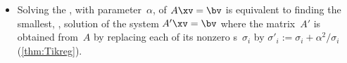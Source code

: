 \begin{itemize}
\item Solving the , with parameter~\(\alpha\), of \(A\xv=\bv\) is equivalent to finding the smallest, , solution of the system \(A'\xv=\bv\) where  
the matrix~\(A'\) is obtained from~\(A\) by replacing each of its nonzero s~\(\sigma_i\) by \(\sigma'_i:=\sigma_i+\alpha^2/\sigma_i\) (\cref{thm:Tikreg}).



\end{itemize}



\makeanswers
